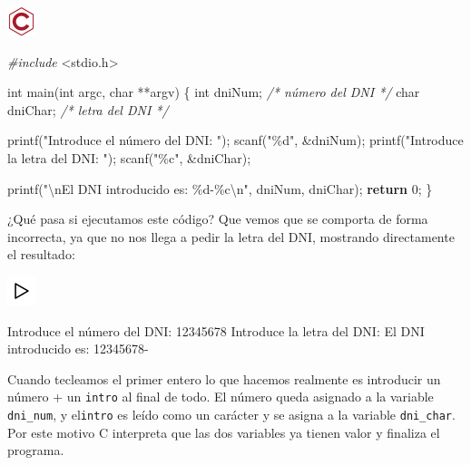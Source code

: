 \documentclass[
]{book}
\newenvironment{Shaded}{\begin{snugshade}}{\end{snugshade}}
\newcommand{\CommentTok}[1]{\textcolor[rgb]{0.56,0.35,0.01}{\textit{#1}}}
\newcommand{\ControlFlowTok}[1]{\textcolor[rgb]{0.13,0.29,0.53}{\textbf{#1}}}
\newcommand{\DataTypeTok}[1]{\textcolor[rgb]{0.13,0.29,0.53}{#1}}
\newcommand{\DecValTok}[1]{\textcolor[rgb]{0.00,0.00,0.81}{#1}}
\newcommand{\ImportTok}[1]{#1}
\newcommand{\NormalTok}[1]{#1}
\newcommand{\PreprocessorTok}[1]{\textcolor[rgb]{0.56,0.35,0.01}{\textit{#1}}}
\newcommand{\SpecialCharTok}[1]{\textcolor[rgb]{0.00,0.00,0.00}{#1}}
\newcommand{\StringTok}[1]{\textcolor[rgb]{0.31,0.60,0.02}{#1}}
\begin{document}
\includegraphics{./img/c_err.png}

\begin{Shaded}
\begin{Highlighting}[]
\PreprocessorTok{\#include }\ImportTok{\textless{}stdio.h\textgreater{}}

\DataTypeTok{int}\NormalTok{ main(}\DataTypeTok{int}\NormalTok{ argc, }\DataTypeTok{char}\NormalTok{ **argv) \{}
    \DataTypeTok{int}\NormalTok{ dniNum;    }\CommentTok{/* número del DNI */}
    \DataTypeTok{char}\NormalTok{ dniChar;  }\CommentTok{/* letra del DNI */}

\NormalTok{    printf(}\StringTok{"Introduce el número del DNI: "}\NormalTok{);}
\NormalTok{    scanf(}\StringTok{"\%d"}\NormalTok{, \&dniNum);}
\NormalTok{    printf(}\StringTok{"Introduce la letra del DNI: "}\NormalTok{);}
\NormalTok{    scanf(}\StringTok{"\%c"}\NormalTok{, \&dniChar);}

\NormalTok{    printf(}\StringTok{"}\SpecialCharTok{\textbackslash{}n}\StringTok{El DNI introducido es: \%d{-}\%c}\SpecialCharTok{\textbackslash{}n}\StringTok{"}\NormalTok{, dniNum, dniChar);}
    \ControlFlowTok{return} \DecValTok{0}\NormalTok{;}
\NormalTok{\}}
\end{Highlighting}
\end{Shaded}

¿Qué pasa si ejecutamos este código? Que vemos que se comporta de forma incorrecta, ya que no nos llega a pedir la letra del DNI, mostrando directamente el resultado:

\includegraphics{./img/play.png}

\begin{Shaded}
\begin{Highlighting}[]
\NormalTok{Introduce el número del DNI: }\DecValTok{12345678}
\NormalTok{Introduce la letra del DNI:}
\NormalTok{El DNI introducido es: }\DecValTok{12345678}\NormalTok{{-}}
\end{Highlighting}
\end{Shaded}

Cuando tecleamos el primer entero lo que hacemos realmente es introducir un número + un \texttt{intro} al final de todo. El número queda asignado a la variable \texttt{dni\_num}, y el\texttt{intro} es leído como un carácter y se asigna a la variable \texttt{dni\_char}. Por este motivo C interpreta que las dos variables ya tienen valor y finaliza el programa.
\end{document}
